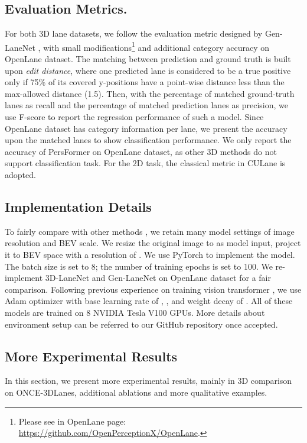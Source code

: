 \documentclass[runningheads]{llncs}
\begin{document}
\subsection{Evaluation Metrics.}
For both 3D lane datasets, we follow the evaluation metric designed by Gen-LaneNet \cite{guo2020gen}, with small modifications\footnote{Please see in OpenLane page: \url{https://github.com/OpenPerceptionX/OpenLane}.} and additional category accuracy on OpenLane dataset. 
The matching between prediction and ground truth is built upon \textit{edit distance}, where one predicted lane is considered to be a true positive only if 75\% of its covered y-positions have a point-wise distance less than the max-allowed distance (1.5).
Then, with the percentage of matched ground-truth lanes as recall and the percentage of matched prediction lanes as precision, we use F-score to report the regression performance of such a model.
Since OpenLane dataset has category information per lane, we present the accuracy upon the matched lanes to show classification performance.
We only report the accuracy of PersFormer on OpenLane dataset, as other 3D methods do not support classification task.
For the 2D task, the classical metric in CULane \cite{pan2018spatial} is adopted.





\subsection{Implementation Details}
To fairly compare with other methods  \cite{guo2020gen,Garnett_2019_ICCV,liu2022learning}, we retain many model settings of image resolution and BEV scale.
We resize the original image to  as model input, project it to BEV space with a resolution of . 
We use PyTorch \cite{paszke2019pytorch} to implement the model.
The batch size is set to 8; the number of training epochs is set to 100.
We re-implement 3D-LaneNet and Gen-LaneNet on OpenLane dataset for a fair comparison.
Following previous experience on training vision transformer  \cite{carion2020end,zhu2021deformable,wang2022detr3d}, we use Adam optimizer \cite{2015KingmaBadam} with base learning rate of , ,  and weight decay of .
All of these models are trained on 8 NVIDIA Tesla V100 GPUs.
More details about environment setup can be referred to our GitHub repository once accepted.


\subsection{More Experimental Results}
In this section, we present more experimental results, mainly in 3D comparison on ONCE-3DLanes, additional ablations and more qualitative examples.
\end{document}
